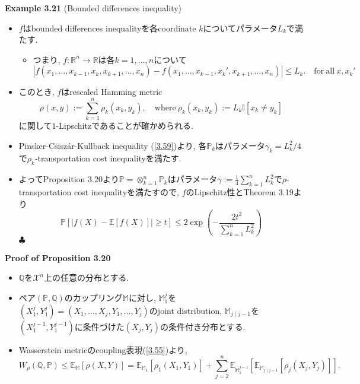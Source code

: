 \documentclass[aspectratio=169, dvipdfmx]{beamer}
\def\endexample{\hfill $\clubsuit$}
\newcommand{\ex}{\mathbb{E}}
\newcommand{\bb}{\mathbb}
\newcommand{\cc}{\mathcal}
\begin{document}
\begin{frame}{}{}
{\bf Example 3.21} (Bounded differences inequality)
\begin{itemize}
    \item $f$はbounded differences inequalityを各coordinate $k$についてパラメータ$L_k$で満たす.
    \begin{itemize}
        \item つまり, $f:\bb{R}^n\to\bb{R}$は各$k = 1,\dots,n$について
        \[
            |f(x_1,\dots,x_{k-1},x_k, x_{k+1},\dots,x_n) - f(x_1,\dots,x_{k-1},x_k', x_{k+1},\dots,x_n)|
            \le L_k.
            \quad \mathrm{for\ all\ } x, x_k'
        \]
    \end{itemize}
    \item このとき, $f$はrescaled Hamming metric
        \[
            \rho(x,y) := \sum_{k=1}^n \rho_k(x_k, y_k),
            \quad \mathrm{where\ } \rho_k(x_k, y_k) := L_k \bb{I}[x_k \ne y_k]
        \]
        に関して$1$-Lipschitzであることが確かめられる.
    \item Pinsker-Csisz\'ar-Kullback inequality (\ref{3.59})より,
    各$\bb{P}_k$はパラメータ$\gamma_k = L_k^2/4$で$\rho_k$-transportation cost inequalityを満たす.
    \item よってProposition 3.20より$\bb{P}=\otimes_{k=1}^n \bb{P}_k$はパラメータ$\gamma := \frac{1}{4}\sum_{k=1}^n L_k^2$で$\rho$-transportation cost inequalityを満たすので,
    $f$のLipschitz性とTheorem 3.19より
    \[
        \bb{P}[|f(X) - \ex[f(X)]| \ge t]
        \le 2 \exp\left(-\frac{2t^2}{\sum_{k=1}^n L_k^2}\right)
        \tag{3.65}\label{3.65}
    \]\endexample
\end{itemize}
\end{frame}

\begin{frame}{}{}
{\bf Proof of Proposition 3.20}
\begin{itemize}
    \item $\bb{Q}$を$\cc{X}^n$上の任意の分布とする.
    \item ペア$(\bb{P}, \bb{Q})$のカップリング$\bb{M}$に対し,
    $\bb{M}_1^j$を$(X_1^j, Y_1^j) = (X_1,\dots,X_j, Y_1,\dots,Y_j)$のjoint distribution,
    $\bb{M}_{j\mid j-1}$を$(X_1^{j-1}, Y_1^{j-1})$に条件づけた$(X_j, Y_j)$の条件付き分布とする.
    \item Wasserstein metricのcoupling表現(\ref{3.55})より,
    \[
        W_\rho(\bb{Q}, \bb{P})
        \le \ex_{\bb{M}} [\rho (X, Y)]
        = \ex_{\bb{M}_1}[\rho_1(X_1, Y_1)] + \sum_{j=2}^n\ex_{\bb{M}_1^{j-1}}\left[\ex_{\bb{M}_{j\mid j-1}}[\rho_j(X_j, Y_j)]\right].
     \]
\end{itemize}
\end{frame}
\end{document}
